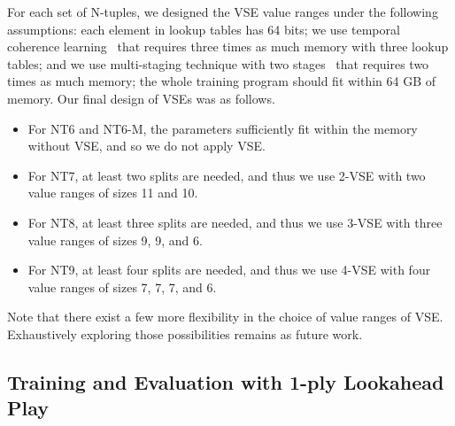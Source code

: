 For each set of N-tuples, we designed the VSE value ranges under the following assumptions: each element in lookup tables has 64 bits; we use temporal coherence learning~\cite{Jask18} that requires three times as much memory with three lookup tables; and we use multi-staging technique with two stages~\cite{GuCW22} that requires two times as much memory; the whole training program should fit within 64 GB of memory.
Our final design of VSEs was as follows.
\begin{itemize}
\item For \textsf{NT6} and \textsf{NT6-M}, the parameters sufficiently fit within the memory without VSE, and so we do not apply VSE.
\item For \textsf{NT7}, at least two splits are needed, and thus we use 2-VSE with two value ranges of sizes 11 and 10.
\item For \textsf{NT8}, at least three splits are needed, and thus we use 3-VSE with three value ranges of sizes 9, 9, and 6.
\item For \textsf{NT9}, at least four splits are needed, and thus we use 4-VSE with four value ranges of sizes 7, 7, 7, and 6.
\end{itemize}

Note that there exist a few more flexibility in the choice of value ranges of VSE.
Exhaustively exploring those possibilities remains as future work.

\subsection{Training and Evaluation with 1-ply Lookahead Play}

